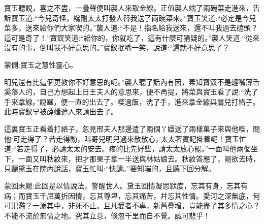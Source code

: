 \begin{parag}
    寶玉聽說，喜之不盡，一疊聲便叫襲人來取金線。正值襲人端了兩碗菜走進來，告訴寶玉道:“今兒奇怪，纔剛太太打發人替我送了兩碗菜來。”寶玉笑道:“必定是今兒菜多，送來給你們大家喫的。”襲人道:“不是！指名給我送來，還不叫我過去磕頭？這可是奇了！”寶釵笑道:“給你的，你就吃了，這有什麼可猜疑的。”襲人笑道:“從來沒有的事，倒叫我不好意思的。”寶釵抿嘴一笑，說道:“這就不好意思了？\begin{note}蒙側:寶玉之慧性靈心。\end{note}明兒還有比這個更教你不好意思的呢。”襲人聽了話內有因，素知寶釵不是輕嘴薄舌奚落人的，自己方想起上日王夫人的意思來，便不再提，將菜與寶玉看了說:“洗了手來拿線。”說畢，便一直的出去了。喫過飯，洗了手，進來拿金線與鶯兒打絡子。此時寶釵早被薛蟠遣人來請出去了。
\end{parag}


\begin{parag}
    這裏寶玉正看着打絡子，忽見邢夫人那邊遣了兩個丫嬛送了兩樣菓子來與他喫，問他‘可走得了？若走得動，叫哥兒明兒過來散散心，’太太著實記掛着呢！寶玉忙道:“若走得了，必請太太的安去。疼的比先好些，請太太放心罷。”一面叫他兩個坐下，一面又叫秋紋來，把才那果子拿一半送與林姑娘去。秋紋答應了，剛欲去時，只聽黛玉在院內說話，寶玉忙叫:“快請。”要知端的，且聽下回分解。
\end{parag}


\begin{parag}
    \begin{note}蒙回末總:此回是以情說法，警醒世人。黛玉回情凝思默度，忘其有身，忘其有病；而寶玉千屈萬折因情，忘其尊卑，忘其痛苦，幷忘其性情。愛河之深無底，何可氾濫？一溺其中，非死不止。且凡愛者不專，新舊疊增，豈能盡了其多情之心？不能不流於無情之地。究其立意，倏忽千里而自不覺。誠可悲乎！\end{note}
\end{parag}

